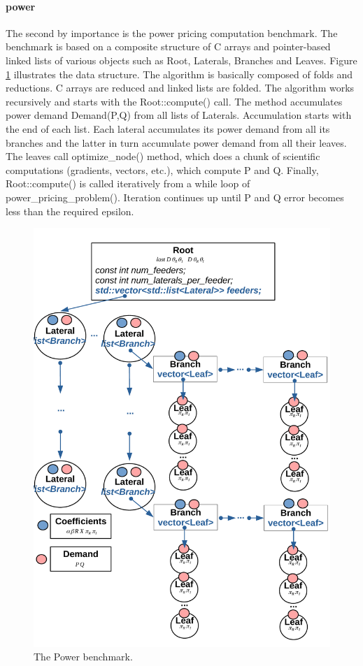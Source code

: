 \paragraph{power} The second by importance is the power pricing computation benchmark. The benchmark is based on a composite structure of C arrays and pointer-based linked lists of various objects such as Root, Laterals, Branches and Leaves. Figure \ref{fig:power_benchmark} illustrates the data structure. The algorithm is basically composed of folds and reductions. C arrays are reduced and linked lists are folded. The algorithm works recursively and starts with the Root::compute() call. The method accumulates power demand
Demand(P,Q) from all lists of Laterals. Accumulation starts with the end of each list. Each lateral accumulates its power demand from all its branches and the latter in turn accumulate power demand from all their leaves. The leaves call
optimize\_node() method, which does a chunk of scientific computations (gradients, vectors, etc.), which compute P and Q. Finally, Root::compute() is called iteratively from a while
loop of power\_pricing\_problem(). Iteration continues up until P and Q error becomes less than the required epsilon. 
\begin{figure}[ht]
\includegraphics[width=1.0\textwidth]{images/power_scheme.pdf}
\caption{The Power benchmark.}
\label{fig:power_benchmark}
\end{figure}

